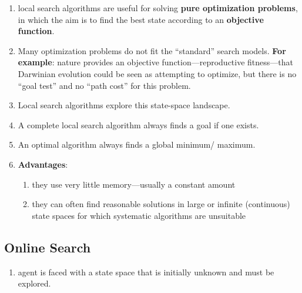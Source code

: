 \begin{enumerate}[itemsep=0.2cm]
    \item local search algorithms are useful for solving \textbf{pure optimization problems}, in which the aim is to find the best state according to an \textbf{objective function}.
    \hfill \cite{ai/book/Artificial-Intelligence-A-Modern-Approach/Russell-Norvig}

    \item Many optimization problems do not fit the “standard” search models. 
    \textbf{For example}: nature provides an objective function—reproductive fitness—that Darwinian evolution could be seen as attempting to optimize, but there is no “goal test” and no “path cost” for this problem.
    \hfill \cite{ai/book/Artificial-Intelligence-A-Modern-Approach/Russell-Norvig}

    \item  Local search algorithms explore this state-space landscape. 
    \hfill \cite{ai/book/Artificial-Intelligence-A-Modern-Approach/Russell-Norvig}

    \item A complete local search algorithm always finds a goal if one exists.
    \hfill \cite{ai/book/Artificial-Intelligence-A-Modern-Approach/Russell-Norvig}
    
    \item An optimal algorithm always finds a global minimum/ maximum.
    \hfill \cite{ai/book/Artificial-Intelligence-A-Modern-Approach/Russell-Norvig}

    \item \textbf{Advantages}: 
    \begin{enumerate}[itemsep=0.2cm]
        \item they use very little memory—usually a constant amount
        \hfill \cite{ai/book/Artificial-Intelligence-A-Modern-Approach/Russell-Norvig}

        \item they can often find reasonable solutions in large or infinite (continuous) state spaces for which systematic algorithms are unsuitable
        \hfill \cite{ai/book/Artificial-Intelligence-A-Modern-Approach/Russell-Norvig}
    \end{enumerate}
\end{enumerate}





\subsection{Online Search}

\begin{enumerate}[itemsep=0.2cm]
    \item agent is faced with a state space that is initially unknown and must be explored.
    \hfill \cite{ai/book/Artificial-Intelligence-A-Modern-Approach/Russell-Norvig}

    
    
\end{enumerate}














